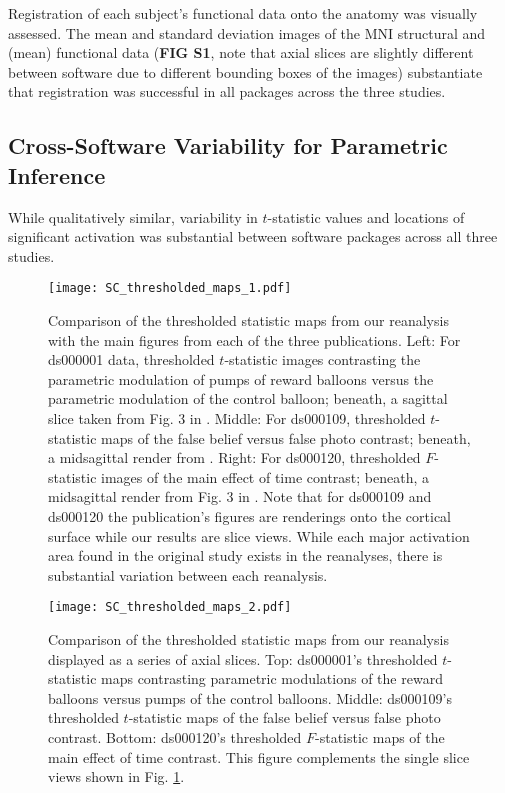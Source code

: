 Registration of each subject's functional data onto the anatomy was visually assessed. The mean and standard deviation images of the MNI structural and (mean) functional data (\textbf{FIG S1}, note that axial slices are slightly different between software due to different bounding boxes of the images) substantiate that registration was successful in all packages across the three studies. 

\subsection{Cross-Software Variability for Parametric Inference}

While qualitatively similar, variability in $t$-statistic values and locations of significant activation was substantial between software packages across all three studies. 

\begin{figure}[htbp]
\centering
	\texttt{[image: SC\_thresholded\_maps\_1.pdf]}	
\caption{Comparison of the thresholded statistic maps from our reanalysis with the main figures from each of the three publications. Left: For ds000001 data, thresholded $t$-statistic images contrasting the parametric modulation of pumps of reward balloons versus the parametric modulation of the control balloon; beneath, a sagittal slice taken from Fig. 3 in \citet{Schonberg2012-oo}. Middle: For ds000109, thresholded $t$-statistic maps of the false belief versus false photo contrast; beneath, a midsagittal render from \citet{Moran2012-cw}. Right: For ds000120, thresholded $F$-statistic images of the main effect of time contrast; beneath, a midsagittal render from Fig. 3 in \citet{Padmanabhan2011-dc}. Note that for ds000109 and ds000120 the publication's figures are renderings onto the cortical surface while our results are slice views. While each major activation area found in the original study exists in the reanalyses, there is substantial variation between each reanalysis.}
\label{fig:SC_thresholded_maps_1}
\end{figure}

\begin{figure}[htbp]
\centering
	\texttt{[image: SC\_thresholded\_maps\_2.pdf]}	
\caption{Comparison of the thresholded statistic maps from our reanalysis displayed as a series of axial slices. Top: ds000001's thresholded $t$-statistic maps contrasting parametric modulations of the reward balloons versus pumps of the control balloons. Middle: ds000109's thresholded $t$-statistic maps of the false belief versus false photo contrast. Bottom: ds000120's thresholded $F$-statistic maps of the main effect of time contrast. This figure complements the single slice views shown in Fig. \ref{fig:SC_thresholded_maps_1}.}
\label{fig:SC_thresholded_maps_2}
\end{figure}

